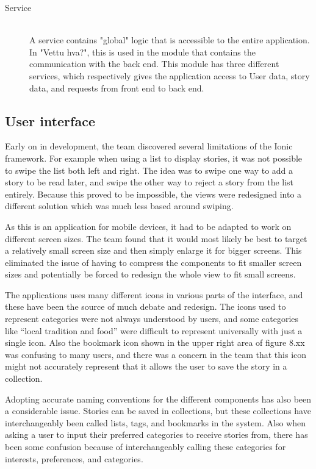 \begin{description}
	\item[Service] \hfill \\ 
	A service contains "global" logic that is accessible to the entire application. In "Vettu hva?", this is used in the module that contains the communication with the back end. This module has three different services, which respectively gives the application access to User data, story data, and requests from front end to back end.
\end{description}

\subsection{User interface}

Early on in development, the team discovered several limitations of the Ionic framework. For example when using a list to display stories, it was not possible to swipe the list both left and right. The idea was to swipe one way to add a story to be read later, and swipe the other way to reject a story from the list entirely.  Because this proved to be impossible, the views were redesigned into a different solution which was much less based around swiping.\newline

As this is an application for mobile devices, it had to be adapted to work on different screen sizes. The team found that it would most likely be best to target a relatively small screen size and then simply enlarge it for bigger screens. This eliminated the issue of having to compress the components to fit smaller screen sizes and potentially be forced to redesign the whole view to fit small screens.\newline

The applications uses many different icons in various parts of the interface, and these have been the source of much debate and redesign. The icons used to represent categories were not always understood by users, and some categories like “local tradition and food” were difficult to represent universally with just a single icon. Also the bookmark icon shown in the upper right area of figure 8.xx was confusing to many users, and there was a concern in the team that this icon might not accurately represent that it allows the user to save the story in a collection.\newline

Adopting accurate naming conventions for the different components has also been a considerable issue. Stories can be saved in collections, but these collections have interchangeably been called lists, tags, and bookmarks in the system. Also when asking a user to input their preferred categories to receive stories from, there has been some confusion because of interchangeably calling these categories for interests,  preferences, and categories.\newline


